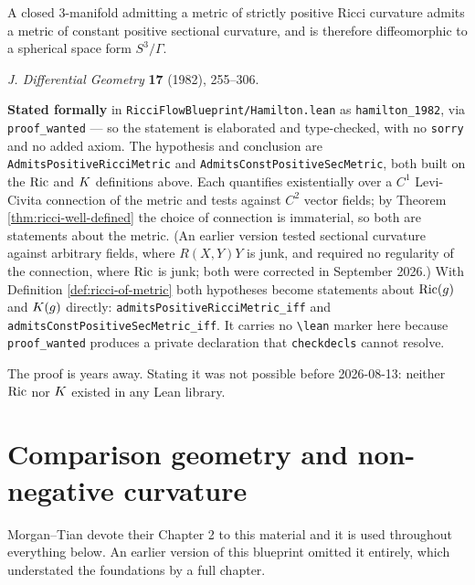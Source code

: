 \begin{theorem}[Hamilton 1982]
  \label{thm:hamilton}
  A closed $3$-manifold admitting a metric of strictly positive Ricci curvature
  admits a metric of constant positive sectional curvature, and is therefore
  diffeomorphic to a spherical space form $S^3/\Gamma$.

  \emph{J. Differential Geometry} \textbf{17} (1982), 255--306.

  \textbf{Stated formally} in \texttt{RicciFlowBlueprint/Hamilton.lean} as
  \texttt{hamilton\_1982}, via \texttt{proof\_wanted} --- so the statement is
  elaborated and type-checked, with no \texttt{sorry} and no added axiom. The
  hypothesis and conclusion are
  \texttt{AdmitsPositiveRicciMetric} and \texttt{AdmitsConstPositiveSecMetric},
  both built on the $\operatorname{Ric}$ and $K$ definitions above. Each quantifies
  existentially over a $C^1$ Levi-Civita connection of the metric and tests
  against $C^2$ vector fields; by Theorem \ref{thm:ricci-well-defined} the
  choice of connection is immaterial, so both are statements about the metric.
  (An earlier version tested sectional curvature against arbitrary fields,
  where $R(X,Y)Y$ is junk, and required no regularity of the connection, where
  $\operatorname{Ric}$ is junk; both were corrected in September 2026.) With
  Definition \ref{def:ricci-of-metric} both hypotheses become statements
  about $\operatorname{Ric}(g)$ and $K(g)$ directly:
  \texttt{admitsPositiveRicciMetric\_iff} and
  \texttt{admitsConstPositiveSecMetric\_iff}. It carries no
  \texttt{\textbackslash lean} marker here because \texttt{proof\_wanted}
  produces a private declaration that \texttt{checkdecls} cannot resolve.

  The proof is years away. Stating it was not possible before
  2026-08-13: neither $\operatorname{Ric}$ nor $K$ existed in any Lean library.
\end{theorem}

\chapter{Comparison geometry and non-negative curvature}
\label{chap:comparison}

Morgan--Tian devote their Chapter 2 to this material and it is used throughout
everything below. An earlier version of this blueprint omitted it entirely,
which understated the foundations by a full chapter.

